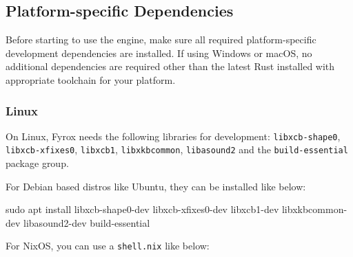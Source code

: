 \documentclass[
]{book}
\newenvironment{Shaded}{\begin{snugshade}}{\end{snugshade}}
\newcommand{\BuiltInTok}[1]{#1}
\newcommand{\KeywordTok}[1]{\textcolor[rgb]{0.13,0.29,0.53}{\textbf{#1}}}
\newcommand{\NormalTok}[1]{#1}
\newcommand{\OperatorTok}[1]{\textcolor[rgb]{0.81,0.36,0.00}{\textbf{#1}}}
\newcommand{\SpecialCharTok}[1]{\textcolor[rgb]{0.81,0.36,0.00}{\textbf{#1}}}
\newcommand{\StringTok}[1]{\textcolor[rgb]{0.31,0.60,0.02}{#1}}
\newcommand{\VariableTok}[1]{\textcolor[rgb]{0.00,0.00,0.00}{#1}}
\theoremstyle{definition}
\theoremstyle{definition}
\theoremstyle{definition}
\theoremstyle{definition}
\theoremstyle{remark}
\begin{document}
\subsection{Platform-specific Dependencies}\label{platform-specific-dependencies}

Before starting to use the engine, make sure all required platform-specific development dependencies are installed. If using Windows or macOS, no additional dependencies are required other than the latest Rust installed with appropriate toolchain for your platform.

\subsubsection{Linux}\label{linux}

On Linux, Fyrox needs the following libraries for development: \texttt{libxcb-shape0}, \texttt{libxcb-xfixes0}, \texttt{libxcb1}, \texttt{libxkbcommon}, \texttt{libasound2} and the \texttt{build-essential} package group.

For Debian based distros like Ubuntu, they can be installed like below:

\begin{Shaded}
\begin{Highlighting}[]
\NormalTok{sudo apt install libxcb{-}shape0{-}dev libxcb{-}xfixes0{-}dev libxcb1{-}dev libxkbcommon{-}dev libasound2{-}dev build{-}essential}
\end{Highlighting}
\end{Shaded}

For NixOS, you can use a \texttt{shell.nix} like below:

\begin{Shaded}
\end{Shaded}
\end{document}
